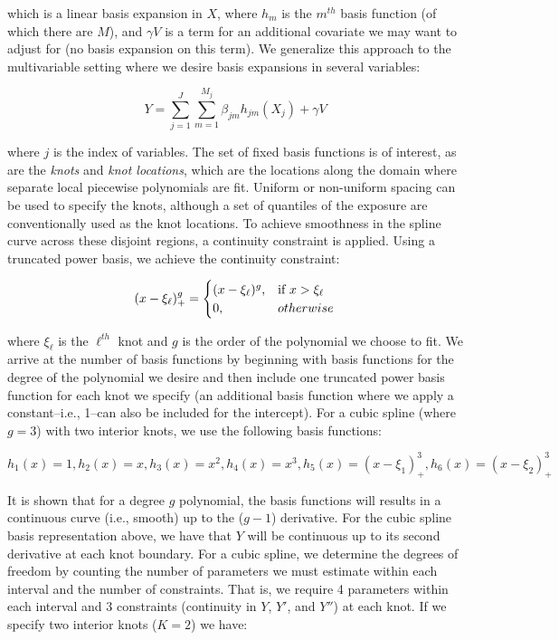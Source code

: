 \documentclass{article}
\begin{document}
\noindent which is a linear basis expansion in $X$, where $h_m$ is the $m^{th}$ basis function (of which there are $M$), and $\gamma V$ is a term for an additional covariate we may want to adjust for (no basis expansion on this term).\supercite{hastie_elements_2009} We generalize this approach to the multivariable setting where we desire basis expansions in several variables:

$$Y=\sum_{j=1}^{J}\sum_{m=1}^{M_j}{\beta_{jm}{h_{jm}}(X_j)+\gamma V}$$

\noindent where $j$ is the index of variables. The set of fixed basis functions is of interest, as are the \textit{knots} and \textit{knot locations}, which are the locations along the domain where separate local piecewise polynomials are fit. Uniform or non-uniform spacing can be used to specify the knots, although a set of quantiles of the exposure are conventionally used as the knot locations. \supercite{james_introduction_2013} To achieve smoothness in the spline curve across these disjoint regions, a continuity constraint is applied. Using a truncated power basis, we achieve the continuity constraint:

\begin{equation}
(x-\xi_\ell)^{g}_{+}=\begin{cases}
(x-\xi_\ell)^{g}, & \text{if  } x > \xi_\ell \\
0, & otherwise  \notag \\
\end{cases}
\end{equation}

\noindent where $\xi_{\ell}$ is the $\ell^{th}$ knot and $g$ is the order of the polynomial we choose to fit. We arrive at the number of basis functions by beginning with basis functions for the degree of the polynomial we desire and then include one truncated power basis function for each knot we specify (an additional basis function where we apply a constant--i.e., 1--can also be included for the intercept).\supercite{james_introduction_2013} For a cubic spline (where $g=3$) with two interior knots, we use the following basis functions:

$$h_1(x)=1,h_2(x)=x, h_3(x)=x^2, h_4(x)=x^3,h_5(x)=(x-\xi_1)^{3}_{+},h_6(x)=(x-\xi_2)^{3}_{+}$$

\noindent It is shown that for a degree $g$ polynomial, the basis functions will results in a continuous curve (i.e., smooth) up to the ($g-1$) derivative. \supercite{james_introduction_2013} For the cubic spline basis representation above, we have that $Y$ will be continuous up to its second derivative at each knot boundary. For a cubic spline, we determine the degrees of freedom by counting the number of parameters we must estimate within each interval and the number of constraints. That is, we require 4 parameters within each interval and 3 constraints (continuity in $Y$, $Y'$, and $Y''$) at each knot. If we specify two interior knots ($K=2$) we have:
\end{document}
